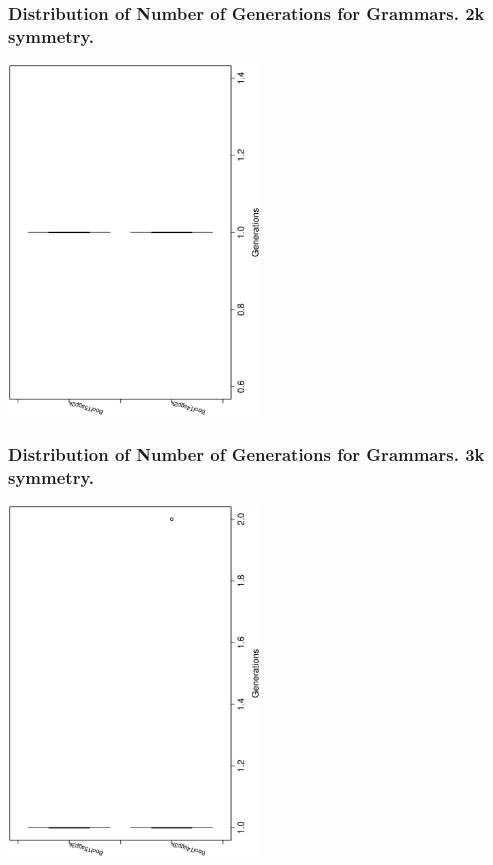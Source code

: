 \documentclass[18pt,c]{beamer}
\begin{document}
 \begin{frame}
 \frametitle{ Distribution of Number of Generations for Grammars. 2k  symmetry. }
 \begin{center}
\includegraphics[width=0.5\textwidth, angle=-90]
{ExpEboxplottGenerations000.eps}
 \end{center}
 \label{ExpEboxplottGenerations000.eps}  
 \end{frame}

 \begin{frame}
 \frametitle{ Distribution of Number of Generations for Grammars. 3k  symmetry. }
 \begin{center}
\includegraphics[width=0.5\textwidth, angle=-90]
{ExpEboxplottGenerations001.eps}
 \end{center}
 \label{ExpEboxplottGenerations001.eps}  
 \end{frame}
\end{document}

